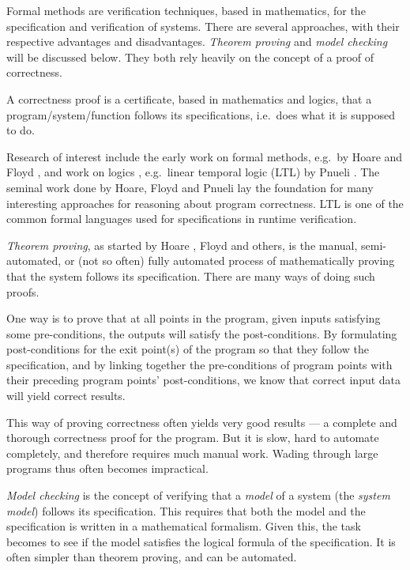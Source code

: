 \documentclass[a4paper,11pt]{kth-mag}
\theoremstyle{definition}
\begin{document}
Formal methods are verification techniques, based in mathematics, for the
specification and verification of systems. There are several approaches, with
their respective advantages and disadvantages. \textit{Theorem proving} and
\textit{model checking} will be discussed below. They both rely heavily on the
concept of a proof of correctness.

A correctness proof is a certificate, based in mathematics and logics, that a
program/system/function follows its specifications, i.e.\ does what it is
supposed to do.

Research of interest include the early work on formal methods, e.g.\ by Hoare
\cite{hoare69} and Floyd \cite{floyd67}, and work on logics , e.g.\ linear
temporal logic (LTL) by Pnueli \cite{pnueli77}. The seminal work done by Hoare,
Floyd and Pnueli lay the foundation for many interesting approaches for
reasoning about program correctness. LTL is one of the common formal languages
used for specifications in runtime verification.

\textit{Theorem proving}, as started by Hoare \cite{hoare69}, Floyd
\cite{floyd67} and others, is the manual, semi-automated, or (not so often)
fully automated process of mathematically proving that the system follows its
specification. There are many ways of doing such proofs.

One way is to prove that at all points in the program, given inputs satisfying
some pre-conditions, the outputs will satisfy the post-conditions. By
formulating post-conditions for the exit point(s) of the program so that they
follow the specification, and by linking together the pre-conditions of program
points with their preceding program points' post-conditions, we know that
correct input data will yield correct results.

This way of proving correctness often yields very good results --- a complete
and thorough correctness proof for the program. But it is slow, hard to
automate completely, and therefore requires much manual work.  Wading through
large programs thus often becomes impractical.

\textit{Model checking} is the concept of verifying that a \textit{model} of a
system (the \textit{system model}) follows its specification. This requires
that both the model and the specification is written in a mathematical
formalism. Given this, the task becomes to see if the model satisfies the
logical formula of the specification. It is often simpler than theorem proving,
and can be automated.
\end{document}
